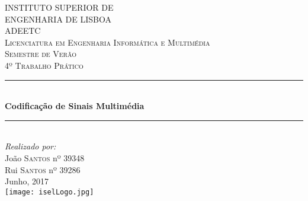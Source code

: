 \documentclass[12pt,a4paper]{article}
\begin{document}
\begin{titlepage}

\newcommand{\HRule}{\rule{\linewidth}{0.5mm}} %

\center %
 

\textsc{\LARGE INSTITUTO SUPERIOR DE \\[0.2cm] ENGENHARIA DE LISBOA}\\[0.5cm]
\textsc{\LARGE ADEETC  }\\[0.3cm]
\textsc{\Large Licenciatura em Engenharia Informática e Multimédia }\\[0.3cm]
\textsc{\Large Semestre de Verão}\\[0.5cm]
\textsc{\Large 4º Trabalho Prático}\\[0.5cm]


\HRule \\[0.4cm]
{ \huge \bfseries Codificação de Sinais Multimédia}\\[0.03cm] %
\HRule \\[1.5cm]

\Large \emph{Realizado por:}\\
João \textsc{Santos} nº 39348\\ 
Rui \textsc{Santos} nº 39286\\[2cm] 

{\large Junho, 2017}\\[1cm]


\texttt{[image: iselLogo.jpg]}\\[1cm]
 
\vfill %
\end{titlepage}
\end{document}
